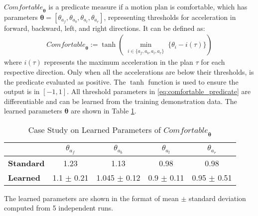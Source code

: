 $\mathit{Comfortable}_{\boldsymbol{\theta}}$ is a predicate measure if a motion plan is comfortable, which has parameters $\boldsymbol{\theta} = [\theta_{a_{f}}, \theta_{a_{b}}, \theta_{a_{l}}, \theta_{a_{r}}]$, representing thresholds for acceleration in forward, backward, left, and right directions. It can be defined as:
\begin{align}
    \mathit{Comfortable}_{\boldsymbol{\theta}} := \tanh(\min_{\substack{i \in \{a_{f}, a_{b}, a_{l}, a_{r}\}}} \{\theta_i - i(\tau)\})
    \label{eq:comfortable_predicate}
\end{align}
where $i(\tau)$ represents the maximum acceleration in the plan $\tau$ for each respective direction.
Only when all the accelerations are below their thresholds, is the predicate evaluated as positive. The $\tanh$ function is used to ensure the output is in $[-1, 1]$. All threshold parameters in \eqref{eq:comfortable_predicate} are differentiable and can be learned from the training demonstration data.
The learned parameters $\boldsymbol{\theta}$ are shown in Table \ref{tab: parameter-optimization}.

\begin{table}[!htp]\centering
    \caption{Case Study on Learned Parameters of $\mathit{Comfortable}_{\boldsymbol{\theta}}$}\label{tab: parameter-optimization}
    \scriptsize
    \begin{tabular}{l|cccc}\toprule
                          & $\theta_{a_{f}}$ & $\theta_{a_{b}}$ & $\theta_{a_{l}}$ & $\theta_{a_{r}}$ \\\midrule
        \textbf{Standard} & 1.23             & 1.13             & 0.98             & 0.98             \\
        \textbf{Learned}  & 1.1  $\pm$ 0.21  & 1.045 $\pm$ 0.12 & 0.9 $\pm$ 0.11   & 0.95 $\pm$ 0.51  \\
        \bottomrule
    \end{tabular}
    \begin{tablenotes}
        \item The learned parameters are shown in the format of mean $\pm$ standard deviation computed from 5 independent runs.
    \end{tablenotes}
\end{table}

